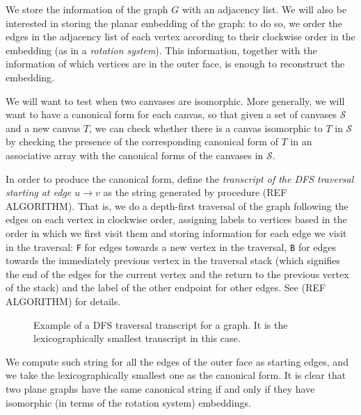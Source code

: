 We store the information of the graph $G$ with an adjacency list. We will also be interested in storing the planar embedding of the graph:
to do so, we order the edges in the adjacency list of each vertex according to their clockwise order in the embedding (as in a
\emph{rotation system}). This information, together with the information of which vertices are in the outer face, is enough to reconstruct
the embedding. 

We will want to test when two canvases are isomorphic. More generally, we will want to have a canonical form for each canvas, so that
given a set of canvases $\mathcal{S}$ and a new canvas $T$, we can check whether there is a canvas isomorphic to $T$ in $\mathcal{S}$ by checking the 
presence of the corresponding canonical form of $T$ in an associative array with the canonical forms of the canvases in $\mathcal{S}$.

In order to produce the canonical form, define the \emph{transcript of the DFS traversal starting at edge $u \rightarrow v$} as the string generated by procedure
(REF ALGORITHM). That is, we do a depth-first traversal of the graph following the edges on each vertex in clockwise order, assigning labels to vertices based in the
order in which we first visit them and storing information for each edge we visit in the traversal: \texttt{F} for edges towards a new vertex in the traversal,
\texttt{B} for edges towards the immediately previous vertex in the traversal stack (which signifies the end of the edges for the current vertex and the return
to the previous vertex of the stack) and the label of the other endpoint for other edges. See (REF ALGORITHM) for details.


\begin{figure}
\centering
\begin{tikzpicture}[main/.style = {draw, circle, fill=white}]

\end{tikzpicture}
\caption{Example of a DFS traversal transcript for a graph. It is the lexicographically smallest transcript in this case.}
\end{figure}


We compute such string for all the edges of the outer face as starting edges, and we take the lexicographically smallest one as the canonical form. It is clear that
two plane graphs have the same canonical string if and only if they have isomorphic (in terms of the rotation system) embeddings. 

